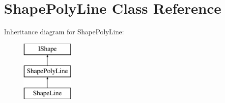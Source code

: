 \hypertarget{class_shape_poly_line}{}\section{Shape\+Poly\+Line Class Reference}
\label{class_shape_poly_line}
Inheritance diagram for Shape\+Poly\+Line\+:\begin{figure}[H]
\begin{center}
\leavevmode
\includegraphics[height=3.000000cm]{class_shape_poly_line}
\end{center}
\end{figure}
